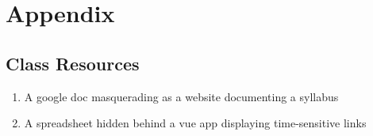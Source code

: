 \documentclass[12pt]{article}
\begin{document}
\section*{Appendix}
\subsection*{Class Resources} 
\begin{enumerate}
    \item A google doc masquerading as a website documenting a syllabus \cite{ONLINE-SYLLABUS}
    \item A spreadsheet hidden behind a vue app displaying time-sensitive links \cite{CLASS-RESOURCES}
    
\end{enumerate}



 
\end{document}
